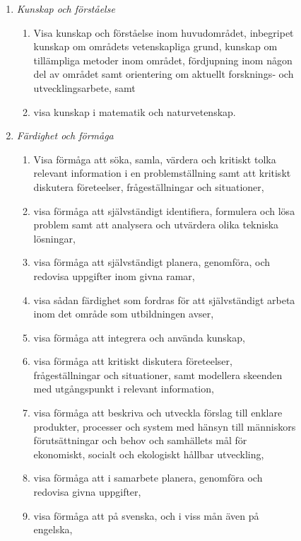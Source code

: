 \begin{figure}[tp]
\begin{tcbframe}
\begin{enumerate}
\def\labelenumi{\emph{\Alph{enumi}.}}
\item \emph{Kunskap och förståelse}
  \begin{enumerate}
  \def\labelenumii{\Alph{enumi}\arabic{enumii}.}
  \tightlist
  \item
    Visa kunskap och förståelse inom huvudområdet, inbegripet kunskap om
    områdets vetenskapliga grund, kunskap om tillämpliga metoder inom
    området, fördjupning inom någon del av området samt orientering om
    aktuellt forsknings‐ och utvecklingsarbete, samt
  \item
    visa kunskap i matematik och naturvetenskap.
  \end{enumerate}
\item \emph{Färdighet och förmåga}
  \begin{enumerate}
  \def\labelenumii{\Alph{enumi}\arabic{enumii}.}
  \tightlist
  \item
    Visa förmåga att söka, samla, värdera och kritiskt tolka relevant
    information i en problemställning samt att kritiskt diskutera
    företeelser, frågeställningar och situationer,
  \item
    visa förmåga att självständigt identifiera, formulera och lösa
    problem samt att analysera och utvärdera olika tekniska lösningar,
  \item
    visa förmåga att självständigt planera, genomföra, och redovisa
    uppgifter inom givna ramar,
  \item
    visa sådan färdighet som fordras för att självständigt arbeta inom
    det område som utbildningen avser,
  \item
    visa förmåga att integrera och använda kunskap,
  \item
    visa förmåga att kritiskt diskutera företeelser, frågeställningar
    och situationer, samt modellera skeenden med utgångspunkt i relevant
    information,
  \item
    visa förmåga att beskriva och utveckla förslag till enklare
    produkter, processer och system med hänsyn till människors
    förutsättningar och behov och samhällets mål för ekonomiskt, socialt
    och ekologiskt hållbar utveckling,
  \item
    visa förmåga att i samarbete planera, genomföra och redovisa givna
    uppgifter,
  \item
    visa förmåga att på svenska, och i viss mån även på engelska,

\end{enumerate}
\end{enumerate}
\end{tcbframe}
\end{figure}
